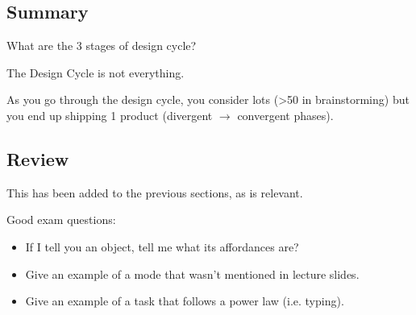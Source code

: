 \subsection{Summary}
What are the 3 stages of design cycle?

The Design Cycle is not everything.

As you go through the design cycle, you consider lots (>50 in brainstorming) but you end up shipping 1 product (divergent $\to$ convergent phases).

\subsection{Review}
\begin{shaded}
This has been added to the previous sections, as is relevant.
\end{shaded}

Good exam questions: 
\begin{itemize}
    \item If I tell you an object, tell me what its affordances are?

    \item Give an example of a mode that wasn't mentioned in lecture slides.

    \item Give an example of a task that follows a power law (i.e. typing).
\end{itemize}
